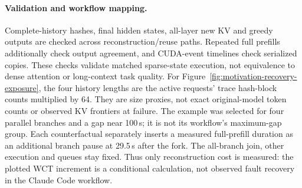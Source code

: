 \documentclass[sigplan,10pt,anonymous,nonacm]{acmart}
\begin{document}
\paragraph{Validation and workflow mapping.}
Complete-history hashes, final hidden states, all-layer new KV and greedy
outputs are checked across reconstruction/reuse paths. Repeated full
prefills additionally check output agreement, and CUDA-event timelines
check serialized copies. These checks validate matched sparse-state
execution, not equivalence to dense attention or long-context task quality.
For Figure~\ref{fig:motivation-recovery-exposure}, the four history lengths
are the active requests' trace hash-block counts multiplied by 64.
They are size proxies, not exact original-model token counts or observed
KV frontiers at failure. The example was selected for four parallel
branches and a gap near 100\,s; it is not its workflow's maximum-gap group.
Each counterfactual separately inserts a measured full-prefill duration
as an additional branch pause at 29.5\,s after the fork. The all-branch
join, other execution and queues stay fixed. Thus only reconstruction
cost is measured: the plotted WCT increment is a conditional calculation,
not observed fault recovery in the Claude Code workflow.
\end{document}
